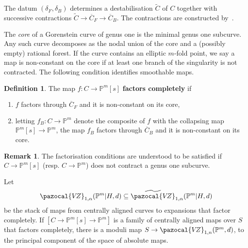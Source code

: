 \documentclass[11pt]{amsart}
\newcommand{\PP}{\mathbb P}
\newcommand{\VZ}{\pazocal{V\!Z}}
\renewcommand{\to}{\rightarrow}
\theoremstyle{definition}
\theoremstyle{definition}
\newtheorem{definition}[thm]{Definition}
\newtheorem*{rem}{Remark}
\begin{document}
The datum $(\delta_F,\delta_B)$ determines a destabilisation $\widetilde C$ of $C$ together with successive contractions $\widetilde C\to \overline C_F\to\overline C_B$. The contractions are constructed by~\cite[Section~3]{RSPW}.

The \emph{core} of a Gorenstein curve of genus one is the minimal genus one subcurve. Any such curve decomposes as the nodal union of the core and a (possibly empty) rational forest. If the curve contains an elliptic $m$-fold point, we say a map is non-constant on the core if at least one branch of the singularity is not contracted.
The following condition identifies smoothable maps. 

\begin{definition}
The map $f\colon C\to \mathbb P^m[s]$ \textbf{factors completely} if 
\begin{enumerate}
\item $f$ factors through $\overline C_F$ and it is non-constant on its core,
\item letting $f_B\colon C\to\PP^m$ denote the composite of $f$ with the collapsing map $\mathbb P^m[s]\to\mathbb P^m$, the map $f_B$ factors through $\overline C_B$ and it is non-constant on its core.
\end{enumerate}
\end{definition}

\begin{rem}
 The factorisation conditions are understood to be satisfied if $C\to \mathbb P^m[s]$ (resp. $C\to \mathbb P^m$) does not contract a genus one subcurve. 
\end{rem}

Let
\begin{equation*} \VZ_{1,\alpha}(\mathbb P^m|H,d) \subseteq \widetilde\VZ_{1,\alpha}(\PP^m|H,d) \end{equation*}
be the stack of maps from centrally aligned curves to expansions that factor completely. If $[C\to \mathbb P^m[s]\to \mathbb P^m]$ is a family of centrally aligned maps over $S$ that factors completely, there is a moduli map $S\to \VZ_{1,n}(\mathbb P^m,d)$, to the principal component of the space of absolute maps. 
\end{document}
